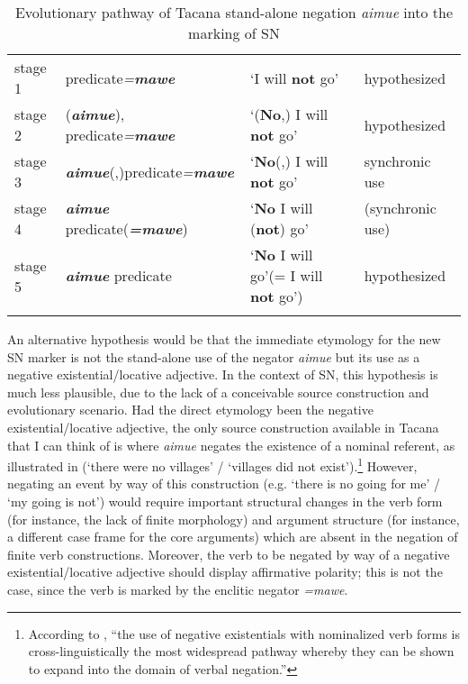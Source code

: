 \documentclass[output=paper]{langsci/langscibook}
\begin{document}
\begin{table}
\caption{Evolutionary pathway of Tacana stand-alone negation \emph{aimue} into the marking of SN}\label{tab:tacana-aimue-pathway}
\small
\begin{tabularx}{\textwidth}{l l Q l}
\lsptoprule
stage 1 & predicate\textit{=\textbf{mawe}} & `I will \textbf{not} go' & hypothesized\\
stage 2 & (\textbf{\textit{aimue}}), predicate\textit{=\textbf{mawe}} & `(\textbf{No},) I will \textbf{not} go' & hypothesized\\
stage 3 & \textbf{\textit{aimue}}(,)predicate\textit{=\textbf{mawe}} & `\textbf{No}(,) I will \textbf{not} go' & synchronic use\\
stage 4 & \textbf{\textit{aimue}} predicate(\textbf{\textit{=mawe}}) & `\textbf{No} I will (\textbf{not}) go' & (synchronic use)\\
stage 5 & \textbf{\textit{aimue}} predicate & `\textbf{No} I will
go'\newline (= I will \textbf{not} go') & hypothesized\\
\lspbottomrule
\end{tabularx} \end{table}


An alternative hypothesis would be that the immediate etymology for the new
SN marker is not the stand-alone use of the negator \textit{aimue} but its
use as a negative existential\slash locative adjective. In the context of
SN, this hypothesis is much less plausible, due to the lack of a
conceivable source construction and evolutionary scenario. Had the direct
etymology been the negative existential\slash locative adjective, the only
source construction available in Tacana that I can think of is where
\textit{aimue} negates the existence of a nominal referent, as illustrated
in  (`there were no villages' \slash{} `villages
did not exist').\footnote{According to \textcite[157]{Veselinova2016}, ``the use of
negative existentials with nominalized verb forms is cross-linguistically
the most widespread pathway whereby they can be shown to expand into the
domain of verbal negation.''} 
%
However, negating an event by way of this construction (e.g. `there
is no going for me' \slash{}  `my going is not') would require important
structural changes in the verb form (for instance, the lack of finite
morphology) and argument structure (for instance, a different case frame
for the core arguments) which are absent in the negation of finite verb
constructions. Moreover, the verb to be negated by way of a negative
existential\slash locative adjective should display affirmative polarity;
this is not the case, since the verb is marked by the enclitic negator
\textit{=mawe}.
\end{document}
